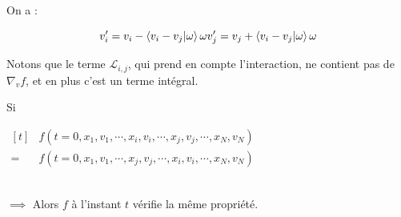 \documentclass[12pt,a4paper]{article}
\begin{document}
	\begin{thm}
		On a :
		
		\vspace{-.5cm}
		
		\[
		v_i' = v_i - \left< v_i-v_j | \omega\right>\omega\\
		v_j' = v_j + \left< v_i-v_j | \omega\right>\omega
		\]
		
		\vspace*{-.8cm}
	\end{thm}
	
	\begin{rmq}
		Notons que le terme $\mathcal L_{i,j}$, qui prend en compte l’interaction, ne contient pas de $\nabla_v f$, et en plus c'est un terme intégral. 
	\end{rmq}
	
	
	\begin{thm} Si \begin{minipage}[t]{15cm}
			$\begin{aligned}[t]
				&f(t=0,x_1,v_1,\cdots,x_i,v_i,\cdots,x_j,v_j,\cdots,x_N,v_N)\\
			   =&f(t=0,x_1,v_1,\cdots,x_j,v_j,\cdots,x_i,v_i,\cdots,x_N,v_N)
			\end{aligned}$
		\end{minipage}\\
		
		$\implies$ Alors $f$ à l'instant $t$ vérifie la même propriété.
	\end{thm}
	
\end{document}

